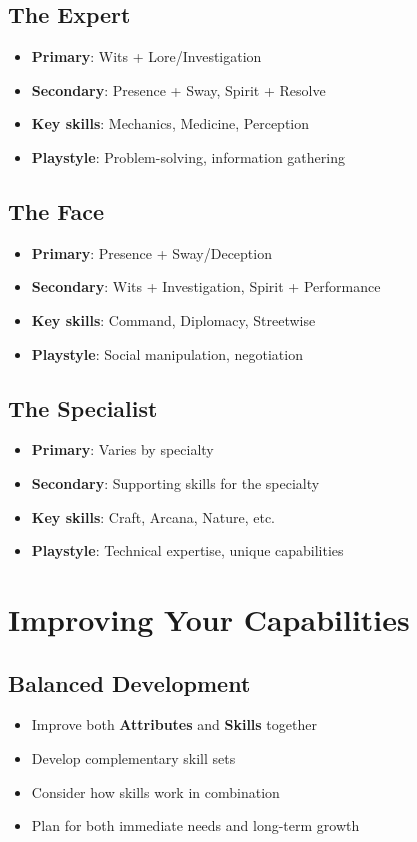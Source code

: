 \subsection*{The Expert}
\begin{itemize}
\item \textbf{Primary}: Wits + Lore/Investigation
\item \textbf{Secondary}: Presence + Sway, Spirit + Resolve
\item \textbf{Key skills}: Mechanics, Medicine, Perception
\item \textbf{Playstyle}: Problem-solving, information gathering
\end{itemize}

\subsection*{The Face}
\begin{itemize}
\item \textbf{Primary}: Presence + Sway/Deception
\item \textbf{Secondary}: Wits + Investigation, Spirit + Performance
\item \textbf{Key skills}: Command, Diplomacy, Streetwise
\item \textbf{Playstyle}: Social manipulation, negotiation
\end{itemize}

\subsection*{The Specialist}
\begin{itemize}
\item \textbf{Primary}: Varies by specialty
\item \textbf{Secondary}: Supporting skills for the specialty
\item \textbf{Key skills}: Craft, Arcana, Nature, etc.
\item \textbf{Playstyle}: Technical expertise, unique capabilities
\end{itemize}

\section{Improving Your Capabilities}

\subsection*{Balanced Development}
\begin{itemize}
\item Improve both \textbf{Attributes} and \textbf{Skills} together
\item Develop complementary skill sets
\item Consider how skills work in combination
\item Plan for both immediate needs and long-term growth
\end{itemize}

